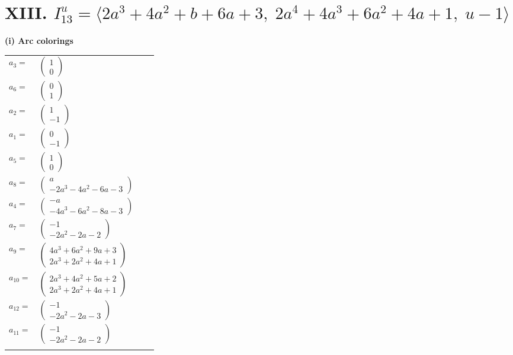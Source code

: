 \documentclass[1p]{elsarticle_modified}
\theoremstyle{definition}
\begin{document}
\centering \section*{XIII. $I^u_{13}= \langle 2 a^3+4 a^2+b+6 a+3,\;2 a^4+4 a^3+6 a^2+4 a+1,\;u-1 \rangle$}
\flushleft \textbf{(i) Arc colorings}\\
\begin{tabular}{m{7pt} m{180pt} m{7pt} m{180pt} }
\flushright $a_{3}=$&$\begin{pmatrix}1\\0\end{pmatrix}$ \\
\flushright $a_{6}=$&$\begin{pmatrix}0\\1\end{pmatrix}$ \\
\flushright $a_{2}=$&$\begin{pmatrix}1\\-1\end{pmatrix}$ \\
\flushright $a_{1}=$&$\begin{pmatrix}0\\-1\end{pmatrix}$ \\
\flushright $a_{5}=$&$\begin{pmatrix}1\\0\end{pmatrix}$ \\
\flushright $a_{8}=$&$\begin{pmatrix}a\\-2 a^3-4 a^2-6 a-3\end{pmatrix}$ \\
\flushright $a_{4}=$&$\begin{pmatrix}- a\\-4 a^3-6 a^2-8 a-3\end{pmatrix}$ \\
\flushright $a_{7}=$&$\begin{pmatrix}-1\\-2 a^2-2 a-2\end{pmatrix}$ \\
\flushright $a_{9}=$&$\begin{pmatrix}4 a^3+6 a^2+9 a+3\\2 a^3+2 a^2+4 a+1\end{pmatrix}$ \\
\flushright $a_{10}=$&$\begin{pmatrix}2 a^3+4 a^2+5 a+2\\2 a^3+2 a^2+4 a+1\end{pmatrix}$ \\
\flushright $a_{12}=$&$\begin{pmatrix}-1\\-2 a^2-2 a-3\end{pmatrix}$ \\
\flushright $a_{11}=$&$\begin{pmatrix}-1\\-2 a^2-2 a-2\end{pmatrix}$\\&\end{tabular}
\end{document}
